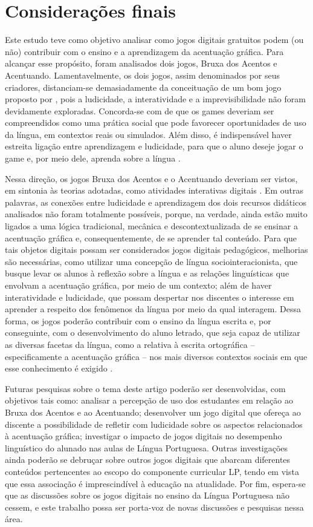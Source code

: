 \documentclass{textolivre}
\begin{document}
\section{Considerações finais}\label{sec-7}
Este estudo teve como objetivo analisar como jogos digitais gratuitos podem (ou não) contribuir com o ensino e a aprendizagem da acentuação gráfica. Para alcançar esse propósito, foram analisados dois jogos, Bruxa dos Acentos e Acentuando. Lamentavelmente, os dois jogos, assim denominados por seus criadores, distanciam-se demasiadamente da conceituação de um bom jogo proposto por \textcite{leffa2012}, pois a ludicidade, a interatividade e a imprevisibilidade não foram devidamente exploradas. Concorda-se com \textcite{leffa2012} de que os games deveriam ser compreendidos como uma prática social que pode favorecer oportunidades de uso da língua, em contextos reais ou simulados. Além disso, é indispensável haver estreita ligação entre aprendizagem e ludicidade, para que o aluno deseje jogar o game e, por meio dele, aprenda sobre a língua \cite{leffa2012}. 

Nessa direção, os jogos Bruxa dos Acentos e o Acentuando deveriam ser vistos, em sintonia às teorias adotadas, como atividades interativas digitais \cite{leffa2012}. Em outras palavras, as conexões entre ludicidade e aprendizagem dos dois recursos didáticos analisados não foram totalmente possíveis, porque, na verdade, ainda estão muito ligados a uma lógica tradicional, mecânica e descontextualizada de se ensinar a acentuação gráfica e, consequentemente, de se aprender tal conteúdo. Para que tais objetos digitais possam ser considerados jogos digitais pedagógicos, melhorias são necessárias, como utilizar uma concepção de língua sociointeracionista, que busque levar os alunos à reflexão sobre a língua e as relações linguísticas que envolvam a acentuação gráfica, por meio de um contexto; além de haver interatividade e ludicidade, que possam despertar nos discentes o interesse em aprender a respeito dos fenômenos da língua por meio da qual interagem. Dessa forma, os jogos poderão contribuir com o ensino da língua escrita e, por conseguinte, com o desenvolvimento do aluno letrado, que seja capaz de utilizar as diversas facetas da língua, como a relativa à escrita ortográfica – especificamente a acentuação gráfica – nos mais diversos contextos sociais em que esse conhecimento é exigido \cite{soares2004, soares2018}. 

Futuras pesquisas sobre o tema deste artigo poderão ser desenvolvidas, com objetivos tais como: analisar a percepção de uso dos estudantes em relação ao Bruxa dos Acentos e ao Acentuando; desenvolver um jogo digital que ofereça ao discente a possibilidade de refletir com ludicidade sobre os aspectos relacionados à acentuação gráfica; investigar o impacto de jogos digitais no desempenho linguístico do alunado nas aulas de Língua Portuguesa. Outras investigações ainda poderão se debruçar sobre outros jogos digitais que abarcam diferentes conteúdos pertencentes ao escopo do componente curricular LP, tendo em vista que essa associação é imprescindível à educação na atualidade. Por fim, espera-se que as discussões sobre os jogos digitais no ensino da Língua Portuguesa não cessem, e este trabalho possa ser porta-voz de novas discussões e pesquisas nessa área.
\end{document}
